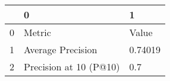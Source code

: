 \begin{tabular}{lll}
\toprule
{} &                       0 &        1 \\
\midrule
0 &                  Metric &    Value \\
1 &       Average Precision &  0.74019 \\
2 &  Precision at 10 (P@10) &      0.7 \\
\bottomrule
\end{tabular}
